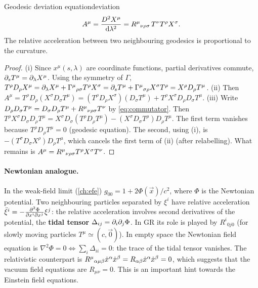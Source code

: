 \begin{theorem}{Geodesic deviation equation}{deviation}
\begin{equation}
  A^\mu=\frac{D^2X^\mu}{\mathrm{d}\lambda^2}=R^{\mu}{}_{\nu\rho\sigma}\,T^\nu T^\rho X^\sigma .
\end{equation}
The relative acceleration between two neighbouring geodesics is proportional to the curvature.
\end{theorem}
\begin{proof}
(i) Since $x^\mu(s,\lambda)$ are coordinate functions, partial derivatives commute, $\partial_s T^\mu=\partial_\lambda X^\mu$. Using the symmetry of $\Gamma$,
$T^\rho D_\rho X^\mu=\partial_\lambda X^\mu+\Gamma^{\mu}{}_{\rho\sigma}T^\rho X^\sigma=\partial_sT^\mu+\Gamma^{\mu}{}_{\sigma\rho}X^\sigma T^\rho=X^\rho D_\rho T^\mu$.
(ii) Then $A^\mu=T^\rho D_\rho(X^\sigma D_\sigma T^\mu)=(T^\rho D_\rho X^\sigma)(D_\sigma T^\mu)+T^\rho X^\sigma D_\rho D_\sigma T^\mu$.
(iii) Write $D_\rho D_\sigma T^\mu=D_\sigma D_\rho T^\mu+R^{\mu}{}_{\nu\rho\sigma}T^\nu$ by \eqref{eq:commutator}. Then
$T^\rho X^\sigma D_\sigma D_\rho T^\mu=X^\sigma D_\sigma(T^\rho D_\rho T^\mu)-(X^\sigma D_\sigma T^\rho)D_\rho T^\mu$. The first term vanishes because $T^\rho D_\rho T^\mu=0$ (geodesic equation). The second, using (i), is $-(T^\sigma D_\sigma X^\rho)D_\rho T^\mu$, which cancels the first term of (ii) (after relabelling). What remains is $A^\mu=R^{\mu}{}_{\nu\rho\sigma}T^\rho X^\sigma T^\nu$.
\end{proof}

\paragraph{Newtonian analogue.} In the weak-field limit (\cref{ch:efe}) $g_{00}=1+2\Phi(\vec x)/c^2$, where $\Phi$ is the Newtonian potential. Two neighbouring particles separated by $\xi^i$ have relative acceleration $\ddot\xi^i=-\frac{\partial^2\Phi}{\partial x^i\partial x^j}\xi^j$: the relative acceleration involves second derivatives of the potential, the \textbf{tidal tensor} $\Delta_{ij}=\partial_i\partial_j\Phi$. In GR its role is played by $R^i{}_{0j0}$ (for slowly moving particles $T^\mu\simeq(c,\vec 0)$). In empty space the Newtonian field equation is $\nabla^2\Phi=0\Leftrightarrow\sum_i\Delta_{ii}=0$: the trace of the tidal tensor vanishes. The relativistic counterpart is $R^{\mu}{}_{\alpha\mu\beta}\dot x^\alpha\dot x^\beta=R_{\alpha\beta}\dot x^\alpha\dot x^\beta=0$, which suggests that the vacuum field equations are $R_{\mu\nu}=0$. This is an important hint towards the Einstein field equations.
